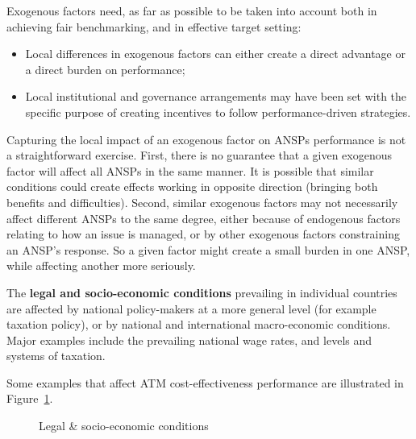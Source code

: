 \documentclass[
  11pt,
  a4paperpaper,
  openany,headsepline=on,footsepline=off,DIV=12,table]{scrbook}
\begin{document}
Exogenous factors need, as far as possible to be taken into account both
in achieving fair benchmarking, and in effective target setting:

\begin{itemize}
\item
  Local differences in exogenous factors can either create a direct
  advantage or a direct burden on performance;
\item
  Local institutional and governance arrangements may have been set with
  the specific purpose of creating incentives to follow
  performance-driven strategies.
\end{itemize}

Capturing the local impact of an exogenous factor on ANSPs performance
is not a straightforward exercise. First, there is no guarantee that a
given exogenous factor will affect all ANSPs in the same manner. It is
possible that similar conditions could create effects working in
opposite direction (bringing both benefits and difficulties). Second,
similar exogenous factors may not necessarily affect different ANSPs to
the same degree, either because of endogenous factors relating to how an
issue is managed, or by other exogenous factors constraining an ANSP's
response. So a given factor might create a small burden in one ANSP,
while affecting another more seriously.

The \textbf{legal and socio-economic conditions} prevailing in
individual countries are affected by national policy-makers at a more
general level (for example taxation policy), or by national and
international macro-economic conditions. Major examples include the
prevailing national wage rates, and levels and systems of taxation.

Some examples that affect ATM cost-effectiveness performance are
illustrated in Figure~\ref{fig-legal-socio}.

\begin{figure}[H]


\caption{\label{fig-legal-socio}Legal \& socio-economic conditions}

\end{figure}%
\end{document}
